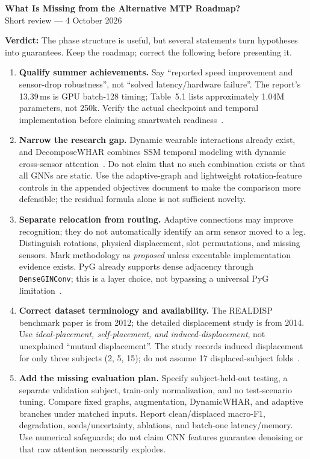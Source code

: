 \documentclass[10pt]{article}
\begin{document}
\begin{center}
{\large\bfseries What Is Missing from the Alternative MTP Roadmap?}\\[3pt]
{\small Short review --- 4 October 2026}
\end{center}

\textbf{Verdict:} The phase structure is useful, but several statements turn hypotheses into guarantees. Keep the roadmap; correct the following before presenting it.

\begin{enumerate}
\item \textbf{Qualify summer achievements.} Say ``reported speed improvement and sensor-drop robustness'', not ``solved latency/hardware failure''. The report's 13.39\,ms is GPU batch-128 timing; Table~5.1 lists approximately 1.04M parameters, not 250k. Verify the actual checkpoint and temporal implementation before claiming smartwatch readiness~\cite{report}.

\item \textbf{Narrow the research gap.} Dynamic wearable interactions already exist, and DecomposeWHAR combines SSM temporal modeling with dynamic cross-sensor attention~\cite{decompose}. Do not claim that no such combination exists or that all GNNs are static. Use the adaptive-graph and lightweight rotation-feature controls in the appended objectives document to make the comparison more defensible; the residual formula alone is not sufficient novelty.

\item \textbf{Separate relocation from routing.} Adaptive connections may improve recognition; they do not automatically identify an arm sensor moved to a leg. Distinguish rotations, physical displacement, slot permutations, and missing sensors. Mark methodology as \emph{proposed} unless executable implementation evidence exists. PyG already supports dense adjacency through \texttt{DenseGINConv}; this is a layer choice, not bypassing a universal PyG limitation~\cite{pyg}.

\item \textbf{Correct dataset terminology and availability.} The REALDISP benchmark paper is from 2012; the detailed displacement study is from 2014. Use \emph{ideal-placement, self-placement, and induced-displacement}, not unexplained ``mutual displacement''. The study records induced displacement for only three subjects (2, 5, 15); do not assume 17 displaced-subject folds~\cite{banos}.

\item \textbf{Add the missing evaluation plan.} Specify subject-held-out testing, a separate validation subject, train-only normalization, and no test-scenario tuning. Compare fixed graphs, augmentation, DynamicWHAR, and adaptive branches under matched inputs. Report clean/displaced macro-F1, degradation, seeds/uncertainty, ablations, and batch-one latency/memory. Use numerical safeguards; do not claim CNN features guarantee denoising or that raw attention necessarily explodes.


\end{enumerate}
\end{document}
